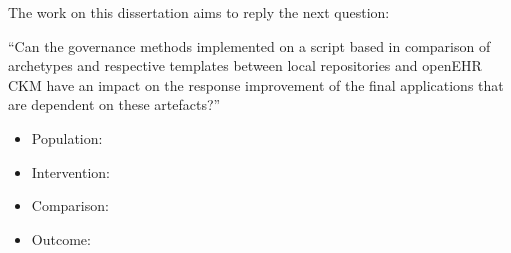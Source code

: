 \documentclass[mim_thesis.tex]{subfiles}
\begin{document}
The work on this dissertation aims to reply the next question:

“Can the governance methods implemented on a script based in comparison of archetypes and respective templates between local repositories and openEHR CKM have an impact on the response improvement of the final applications that are dependent on these artefacts?”

\begin{itemize}
\item Population: 
\item Intervention:
\item Comparison:
\item Outcome:
\end{itemize}
\end{document}
